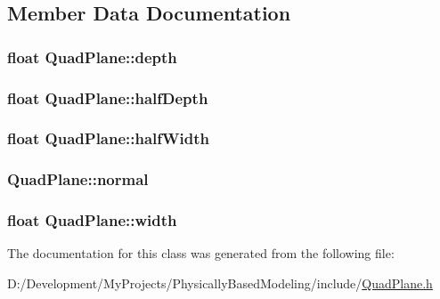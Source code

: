 \subsection{Member Data Documentation}
\hypertarget{class_quad_plane_a38aaa492e76f934ff0661e234ba6c19a}{
\subsubsection[{depth}]{\setlength{\rightskip}{0pt plus 5cm}float Quad\-Plane\-::depth\hspace{0.3cm}{\ttfamily [protected]}}}\label{class_quad_plane_a38aaa492e76f934ff0661e234ba6c19a}
\hypertarget{class_quad_plane_a4b0a1e6811947b552b8a9227a8074e88}{
\subsubsection[{half\-Depth}]{\setlength{\rightskip}{0pt plus 5cm}float Quad\-Plane\-::half\-Depth\hspace{0.3cm}{\ttfamily [protected]}}}\label{class_quad_plane_a4b0a1e6811947b552b8a9227a8074e88}
\hypertarget{class_quad_plane_a79fd779d6272282ea4879a9fedf8792c}{
\subsubsection[{half\-Width}]{\setlength{\rightskip}{0pt plus 5cm}float Quad\-Plane\-::half\-Width\hspace{0.3cm}{\ttfamily [protected]}}}\label{class_quad_plane_a79fd779d6272282ea4879a9fedf8792c}
\hypertarget{class_quad_plane_af4e1dfc6a945fca065e6ab9387c05223}{
\subsubsection[{normal}]{ Quad\-Plane\-::normal\hspace{0.3cm}{\ttfamily [protected]}}}\label{class_quad_plane_af4e1dfc6a945fca065e6ab9387c05223}
\hypertarget{class_quad_plane_aee2609c9c822afa7bc7397c190951bb5}{
\subsubsection[{width}]{\setlength{\rightskip}{0pt plus 5cm}float Quad\-Plane\-::width\hspace{0.3cm}{\ttfamily [protected]}}}\label{class_quad_plane_aee2609c9c822afa7bc7397c190951bb5}


The documentation for this class was generated from the following file\-:\begin{DoxyCompactItemize}
\item 
D\-:/\-Development/\-My\-Projects/\-Physically\-Based\-Modeling/include/\hyperlink{_quad_plane_8h}{Quad\-Plane.\-h}\end{DoxyCompactItemize}
